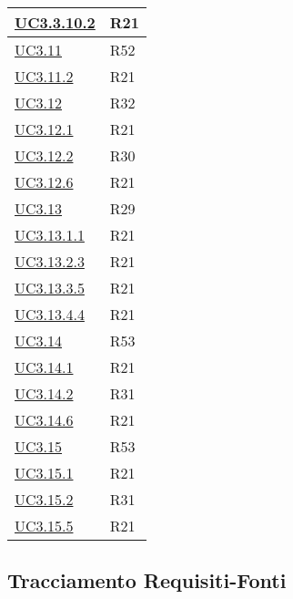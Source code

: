 \begin{longtable}{|P{6cm}|P{6cm}|}
	\hline \hyperref[UC3.10.2]{UC3.3.10.2} & R21 \\
	\hline \hyperref[UC3.11]{UC3.11} & R52 \\
	\hline \hyperref[UC3.11.2]{UC3.11.2} & R21 \\
	\hline \hyperref[UC3.12]{UC3.12} & R32 \\
	\hline \hyperref[UC3.12.1]{UC3.12.1} & R21 \\
	\hline \hyperref[UC3.12.2]{UC3.12.2} & R30 \\
	\hline \hyperref[UC3.12.6]{UC3.12.6} & R21 \\
	\hline \hyperref[UC3.13]{UC3.13} & R29 \\
	\hline \hyperref[UC3.13.1.1]{UC3.13.1.1} & R21 \\
	\hline \hyperref[UC3.13.2.3]{UC3.13.2.3} & R21 \\
	\hline \hyperref[UC3.13.3.5]{UC3.13.3.5} & R21 \\
	\hline \hyperref[UC3.13.4.4]{UC3.13.4.4} & R21 \\
	\hline \hyperref[UC3.14]{UC3.14} & R53 \\
	\hline \hyperref[UC3.14.1]{UC3.14.1} & R21 \\
	\hline \hyperref[UC3.14.2]{UC3.14.2} & R31 \\
	\hline \hyperref[UC3.14.6]{UC3.14.6} & R21 \\
	\hline \hyperref[UC3.15]{UC3.15} & R53 \\
	\hline \hyperref[UC3.15.1]{UC3.15.1} & R21 \\
	\hline \hyperref[UC3.15.2]{UC3.15.2} & R31 \\
	\hline \hyperref[UC3.15.5]{UC3.15.5} & R21 \\
	\hline
\end{longtable}

\subsection{Tracciamento Requisiti-Fonti}


